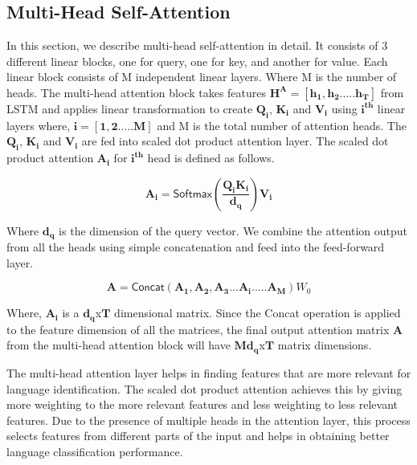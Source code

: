 \documentclass{article}
\begin{document}
\subsection{Multi-Head Self-Attention}
In this section, we describe multi-head self-attention in detail. It consists of 3 different linear blocks, one for query, one for key, and another for value. Each linear block consists of M independent linear layers. Where M is the number of heads. The multi-head attention block takes features $\boldsymbol{H^A=[h_1,h_2.....h_T]}$  from LSTM and applies linear transformation to create $\boldsymbol{Q_i}$, $\boldsymbol{K_i}$ and $\boldsymbol{V_i}$ using $\boldsymbol{i^{\text{th}}}$ linear layers where, $\boldsymbol{i=[1,2.....M]}$  and M is the total number of attention heads. The $\boldsymbol{Q_i}$, $\boldsymbol{K_i}$ and $\boldsymbol{V_i}$ are fed into scaled dot product attention layer. The scaled dot product attention $\boldsymbol{A_i}$ for $\boldsymbol{i^{\text{th}}}$ head is defined as follows.

\begin{equation}
\boldsymbol{A_i} = \textsf{Softmax}(\boldsymbol{\frac{Q_iK_i}{d_q}})\boldsymbol{V_i}
\end{equation}

Where $\boldsymbol{d_q}$ is the dimension of the query vector. We combine the attention output from all the heads using simple concatenation and feed into the feed-forward layer.

\begin{equation}
\boldsymbol{A} = \textsf{Concat}(\boldsymbol{A_1,A_2,A_3...A_i.....A_M}){W_0}
\end{equation}

Where, $\boldsymbol{A_i}$ is a $\boldsymbol{d_q}$x$\boldsymbol{T}$ dimensional matrix.
Since the \textsf{Concat} operation is applied to the feature dimension of all the matrices, the final output attention matrix $\boldsymbol{A}$ from the multi-head attention block will have  $\boldsymbol{Md_q}$x$\boldsymbol{T}$ matrix dimensions.

The multi-head attention layer helps in finding features that are more relevant for language identification. The scaled dot product attention achieves this by giving more weighting to the more relevant features and less weighting to less relevant features. Due to the presence of multiple heads in the attention layer, this process selects features from different parts of the input and helps in obtaining better language classification performance.
\end{document}
